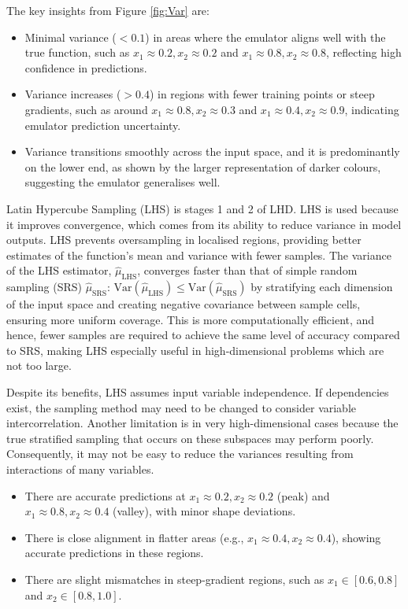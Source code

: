 \noindent The key insights from Figure \ref{fig:Var} are:
\begin{itemize}
    \item Minimal variance (\(< 0.1\)) in areas where the emulator aligns well with the true function, such as \(x_1 \approx 0.2, x_2 \approx 0.2\) and \(x_1 \approx 0.8, x_2 \approx 0.8\), reflecting high confidence in predictions.
    \item Variance increases (\(> 0.4\)) in regions with fewer training points or steep gradients, such as around \(x_1 \approx 0.8, x_2 \approx 0.3\) and \(x_1 \approx 0.4, x_2 \approx 0.9\), indicating emulator prediction uncertainty.
    \item Variance transitions smoothly across the input space, and it is predominantly on the lower end, as shown by the larger representation of darker colours, suggesting the emulator generalises well.
\end{itemize}

Latin Hypercube Sampling (LHS) is stages 1 and 2 of LHD. LHS is used because it improves convergence, which comes from its ability to reduce variance in model outputs. LHS prevents oversampling in localised regions, providing better estimates of the function's mean and variance with fewer samples.\cite{owen1998latin} The variance of the LHS estimator, \( \hat{\mu}_{\text{LHS}} \), converges faster than that of simple random sampling (SRS) \( \hat{\mu}_{\text{SRS}} \): $\text{Var}(\hat{\mu}_{\text{LHS}}) \leq \text{Var}(\hat{\mu}_{\text{SRS}})$ by stratifying each dimension of the input space and creating negative covariance between sample cells, ensuring more uniform coverage.\cite{SHIELDS201696} This is more computationally efficient, and hence, fewer samples are required to achieve the same level of accuracy compared to SRS, making LHS especially useful in high-dimensional problems which are not too large.

Despite its benefits, LHS assumes input variable independence. If dependencies exist, the sampling method may need to be changed to consider variable intercorrelation. Another limitation is in very high-dimensional cases because the true stratified sampling that occurs on these subspaces may perform poorly.\cite{SHIELDS201696} Consequently, it may not be easy to reduce the variances resulting from interactions of many variables.\cite{SHIELDS201696}

\begin{itemize}
    \item There are accurate predictions at \(x_1 \approx 0.2, x_2 \approx 0.2\) (peak) and \(x_1 \approx 0.8, x_2 \approx 0.4\) (valley), with minor shape deviations.
    \item There is close alignment in flatter areas (e.g., \(x_1 \approx 0.4, x_2 \approx 0.4\)), showing accurate predictions in these regions.
    \item There are slight mismatches in steep-gradient regions, such as \(x_1 \in [0.6,0.8]\) and \(x_2 \in [0.8,1.0]\).
\end{itemize}

